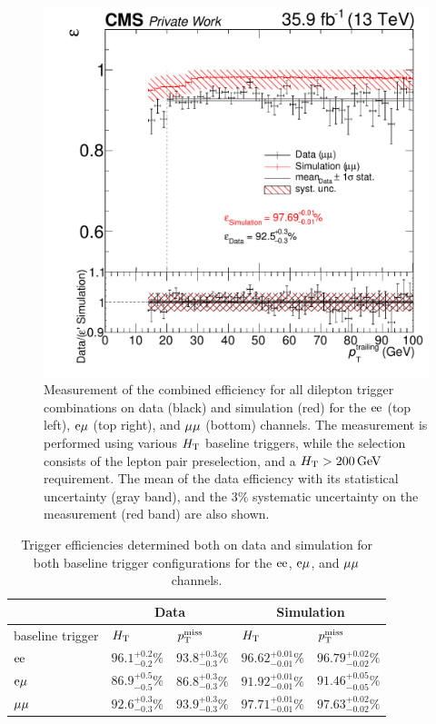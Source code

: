 \begin{figure}[htb]
 \includegraphics[width=\pairwidth]{figures/triggerStudies/efficiency_dataHT_trigDilep_MM_pt2}
 \caption{Measurement of the combined efficiency for all dilepton trigger combinations on data (black) and simulation (red) for the $\mathrm{e}\mathrm{e}$ (top left), $\mathrm{e}\mu$ (top right), and $\mu\mu$ (bottom) channels. The measurement is performed using various $H_{\mathrm{T}}$ baseline triggers, while the selection consists of the lepton pair preselection, and a $H_{\mathrm{T}}>200\,\text{Ge\hspace{-.08em}V}$ requirement. The mean of the data efficiency with its statistical uncertainty (gray band), and the $3\%$ systematic uncertainty on the measurement (red band) are also shown.}
 \label{fig:triggEff}
\end{figure}


\begin{table}[htb]
 \centering
 \caption{Trigger efficiencies determined both on data and simulation for both baseline trigger
  configurations for the $\mathrm{e}\mathrm{e}$, $\mathrm{e}{\mu}$, and ${\mu}{\mu}$ channels.}
 \label{tab:triggEff}
 \begin{tabular}{lllll}
                   & \multicolumn{2}{c}{Data} & \multicolumn{2}{c}{Simulation}                                                         \\\hline
  baseline trigger & $H_{\mathrm{T}}$                    & $p_{\mathrm{T}}^\text{miss}$                      & $H_{\mathrm{T}}$                     & $p_{\mathrm{T}}^\text{miss}$                 \\\hline
  $\mathrm{e}\mathrm{e}$         & $96.1^{+0.2}_{-0.2}\%$   & $93.8^{+0.3}_{-0.3}\%$         & $96.62^{+0.01}_{-0.01}\%$ & $96.79^{+0.02}_{-0.02}\%$ \\
  $\mathrm{e}{\mu}$        & $86.9^{+0.5}_{-0.5}\%$   & $86.8^{+0.3}_{-0.3}\%$         & $91.92^{+0.01}_{-0.01}\%$ & $91.46^{+0.05}_{-0.05}\%$ \\
  ${\mu}{\mu}$       & $92.6^{+0.3}_{-0.3}\%$   & $93.9^{+0.3}_{-0.3}\%$         & $97.71^{+0.01}_{-0.01}\%$ & $97.63^{+0.02}_{-0.02}\%$ \\\hline
 \end{tabular}
\end{table}


